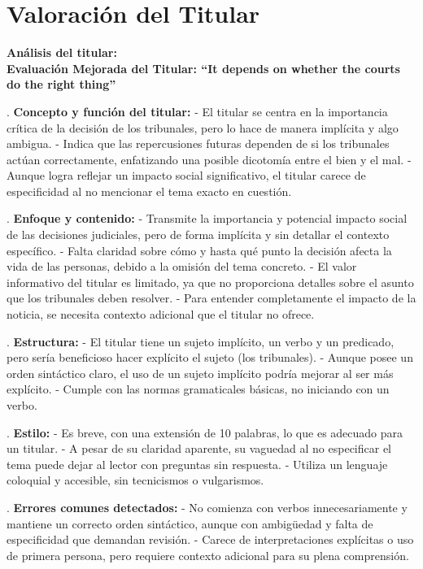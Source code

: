 \documentclass[10pt,a4paper]{article}
\begin{document}
\section*{Valoración del Titular}
        \textbf{Análisis del titular:} \\ 
        \textbf{Evaluaci\'{o}n Mejorada del Titular: ``It depends on whether the courts do the right thing''}
\par{}. \textbf{Concepto y funci\'{o}n del titular:}    - El titular se centra en la importancia cr\'{i}tica de la decisi\'{o}n de los tribunales, pero lo hace de manera impl\'{i}cita y algo ambigua.    - Indica que las repercusiones futuras dependen de si los tribunales act\'{u}an correctamente, enfatizando una posible dicotom\'{i}a entre el bien y el mal.    - Aunque logra reflejar un impacto social significativo, el titular carece de especificidad al no mencionar el tema exacto en cuesti\'{o}n.
\par{}. \textbf{Enfoque y contenido:}    - Transmite la importancia y potencial impacto social de las decisiones judiciales, pero de forma impl\'{i}cita y sin detallar el contexto espec\'{i}fico.    - Falta claridad sobre c\'{o}mo y hasta qu\'{e} punto la decisi\'{o}n afecta la vida de las personas, debido a la omisi\'{o}n del tema concreto.    - El valor informativo del titular es limitado, ya que no proporciona detalles sobre el asunto que los tribunales deben resolver.    - Para entender completamente el impacto de la noticia, se necesita contexto adicional que el titular no ofrece.
\par{}. \textbf{Estructura:}    - El titular tiene un sujeto impl\'{i}cito, un verbo y un predicado, pero ser\'{i}a beneficioso hacer expl\'{i}cito el sujeto (los tribunales).    - Aunque posee un orden sint\'{a}ctico claro, el uso de un sujeto impl\'{i}cito podr\'{i}a mejorar al ser m\'{a}s expl\'{i}cito.    - Cumple con las normas gramaticales b\'{a}sicas, no iniciando con un verbo.
\par{}. \textbf{Estilo:}    - Es breve, con una extensi\'{o}n de 10 palabras, lo que es adecuado para un titular.    - A pesar de su claridad aparente, su vaguedad al no especificar el tema puede dejar al lector con preguntas sin respuesta.    - Utiliza un lenguaje coloquial y accesible, sin tecnicismos o vulgarismos.
\par{}. \textbf{Errores comunes detectados:}    - No comienza con verbos innecesariamente y mantiene un correcto orden sint\'{a}ctico, aunque con ambig\"{u}edad y falta de especificidad que demandan revisi\'{o}n.    - Carece de interpretaciones expl\'{i}citas o uso de primera persona, pero requiere contexto adicional para su plena comprensi\'{o}n.
\end{document}
